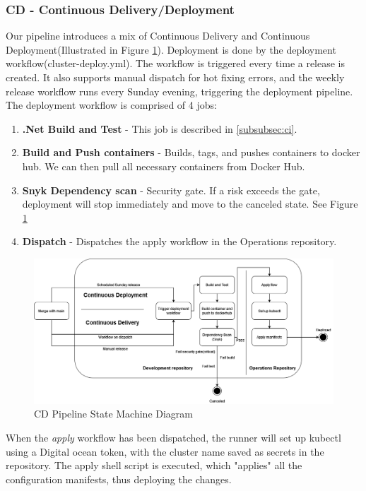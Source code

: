 \subsubsection{CD - Continuous Delivery/Deployment}
\label{subsubsec:cd}

Our pipeline introduces a mix of Continuous Delivery and Continuous Deployment(Illustrated in Figure \ref{fig:CDStateMachine}). Deployment is done by the deployment workflow(cluster-deploy.yml).
The workflow is triggered every time a release is created. It also supports manual dispatch for hot fixing errors, and the weekly release workflow runs every Sunday evening, triggering the deployment pipeline. The deployment workflow is comprised of 4 jobs:
\begin{enumerate}
    \item \textbf{.Net Build and Test} - This job is described in \ref{subsubsec:ci}.
    \item \textbf{Build and Push containers} - Builds, tags, and pushes containers to docker hub. We can then pull all necessary containers from Docker Hub.
    \item \textbf{Snyk Dependency scan} - Security gate. If a risk exceeds the gate, deployment will stop immediately and move to the canceled state. See Figure \ref{fig:CDStateMachine}
    \item \textbf{Dispatch} - Dispatches the apply workflow in the Operations repository.
\end{enumerate}

\begin{figure}[H]
    \centering
    \includegraphics[scale=0.44]{images/ci_cd_diagrams/DevopsDiagrams-StateMachineCd.drawio.png}
    \caption{CD Pipeline State Machine Diagram}
    \label{fig:CDStateMachine}
\end{figure}

When the \textit{apply} workflow has been dispatched, the runner will set up kubectl using a Digital ocean token, with the cluster name saved as secrets in the repository. The apply shell script is executed, which "applies" all the configuration manifests, thus deploying the changes.

